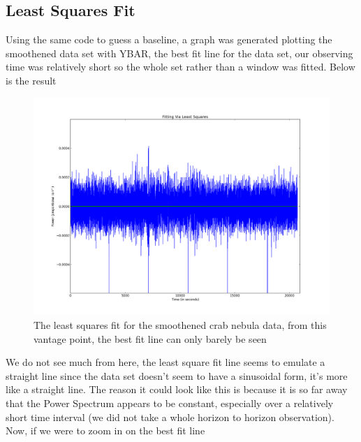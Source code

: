 \documentclass[12 pt]{article}
\begin{document}
\subsection*{Least Squares Fit}
Using the same code to guess a baseline, a graph was generated plotting
the smoothened data set with YBAR, the best fit line for the data
set, our observing time was relatively short so the whole set rather
than a window was fitted. Below is the result
 
\begin{figure}[H]
\centering
\includegraphics[scale=0.45]{crablsqfit.png}
\caption{The least squares fit for the smoothened crab nebula data,
  from this vantage point, the best fit line can only barely be seen}
\label{crablsqfit}
\end{figure}

We do not see much from here, the least square fit line seems to emulate
a straight line since the data set doesn't seem to have a sinusoidal form, it's
more like a straight line. The reason it could look like this is because it
is so far away that the Power Spectrum appears to be constant, especially
over a relatively short time interval (we did not take a whole horizon
to horizon observation). Now, if we were to zoom in  on the best fit line 
\end{document}
